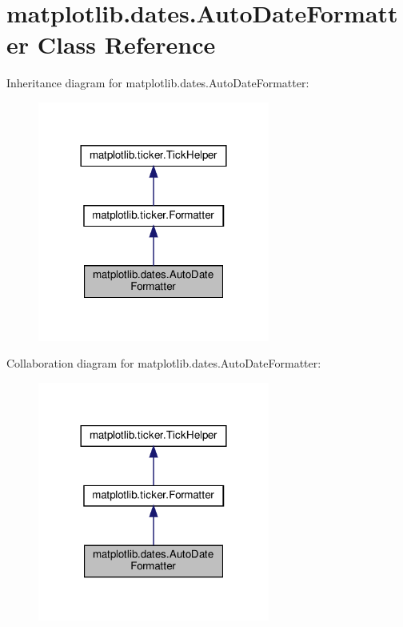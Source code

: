 \hypertarget{classmatplotlib_1_1dates_1_1AutoDateFormatter}{}\section{matplotlib.\+dates.\+Auto\+Date\+Formatter Class Reference}
\label{classmatplotlib_1_1dates_1_1AutoDateFormatter}


Inheritance diagram for matplotlib.\+dates.\+Auto\+Date\+Formatter\+:
\nopagebreak
\begin{figure}[H]
\begin{center}
\leavevmode
\includegraphics[width=216pt]{classmatplotlib_1_1dates_1_1AutoDateFormatter__inherit__graph}
\end{center}
\end{figure}


Collaboration diagram for matplotlib.\+dates.\+Auto\+Date\+Formatter\+:
\nopagebreak
\begin{figure}[H]
\begin{center}
\leavevmode
\includegraphics[width=216pt]{classmatplotlib_1_1dates_1_1AutoDateFormatter__coll__graph}
\end{center}
\end{figure}
